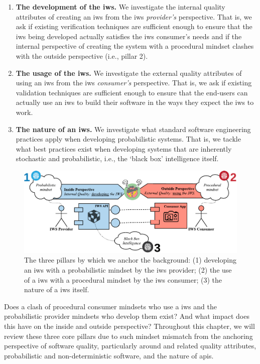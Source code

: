 \begin{enumerate}[label=\textbf{(\arabic*})]
\item \textbf{The development of the \gls{iws}.} We investigate the internal quality attributes of creating an \gls{iws} from the \gls{iws} \textit{provider's} perspective. That is, we ask if existing verification techniques are sufficient enough to ensure that the \gls{iws} being developed actually satisfies the \gls{iws} consumer's needs and if the internal perspective of creating the system with a procedural mindset clashes with the outside perspective (i.e., pillar 2).
\item \textbf{The usage of the \gls{iws}.} We investigate the external quality attributes of using an \gls{iws} from the \gls{iws} \textit{consumer's} perspective. That is, we ask if existing validation techniques are sufficient enough to ensure that the end-users can actually use an \gls{iws} to build their software in the ways they expect the \gls{iws} to work.
\item \textbf{The nature of an \gls{iws}.} We investigate what standard software engineering practices apply when developing probabilistic systems. That is, we tackle what best practices exist when developing systems that are inherently stochastic and probabilistic, i.e., the `black box' intelligence itself.
\end{enumerate}

\begin{figure}[hbt]
  \centering
  \includegraphics[width=\linewidth]{iws-mindset-clash-pillars}
  \caption[Mindset clashes within the development, use and nature of a IWS]{The three pillars by which we anchor the background: (1) developing an \gls{iws} with a probabilistic mindset by the \gls{iws} provider; (2) the use of a \gls{iws} with a procedural mindset by the \gls{iws} consumer; (3) the nature of a \gls{iws} itself.}
  \label{fig:background:preface:iws-mindset-clash-pillars}
\end{figure}

Does a clash of procedural consumer mindsets who use a \gls{iws} and the probabilistic provider mindsets who develop them exist? And what impact does this have on the inside and outside perspective? Throughout this chapter, we will review these three core pillars due to such  mindset mismatch from the anchoring perspective of software quality, particularly around  and related quality attributes, probabilistic and non-deterministic software, and the nature of \glspl{api}. 

